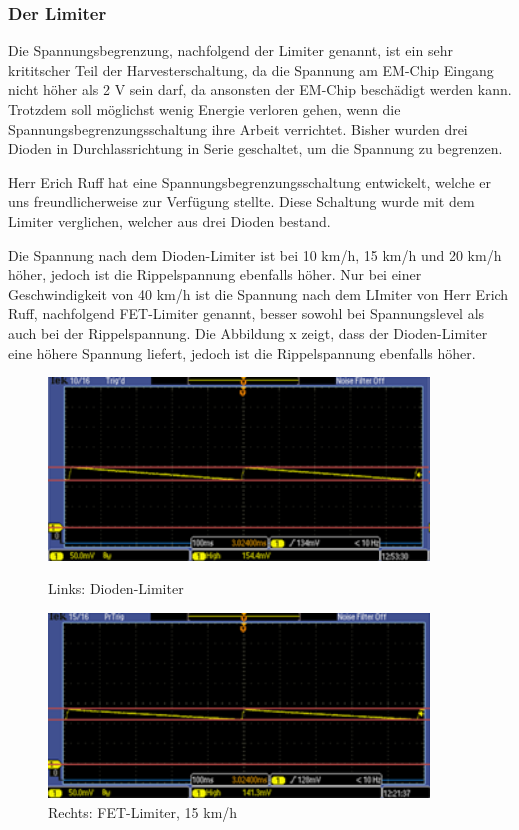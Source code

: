 \subsubsection{Der Limiter}

Die Spannungsbegrenzung, nachfolgend der Limiter genannt, ist ein sehr krititscher Teil der Harvesterschaltung, da die Spannung am EM-Chip Eingang nicht höher als 2 V sein darf, da ansonsten der EM-Chip beschädigt werden kann. Trotzdem soll möglichst wenig Energie verloren gehen, wenn die Spannungsbegrenzungsschaltung ihre Arbeit verrichtet. Bisher wurden drei Dioden in Durchlassrichtung in Serie geschaltet, um die Spannung zu begrenzen.

Herr Erich Ruff hat eine Spannungsbegrenzungsschaltung entwickelt, welche er uns freundlicherweise zur Verfügung stellte. Diese Schaltung wurde mit dem Limiter verglichen, welcher aus drei Dioden bestand.

Die Spannung nach dem Dioden-Limiter ist bei 10 km/h, 15 km/h und 20 km/h höher, jedoch ist die Rippelspannung ebenfalls höher. Nur bei einer Geschwindigkeit von 40 km/h ist die Spannung nach dem LImiter von Herr Erich Ruff, nachfolgend FET-Limiter genannt, besser sowohl bei Spannungslevel als auch bei der Rippelspannung. Die Abbildung x zeigt, dass der Dioden-Limiter eine höhere Spannung liefert, jedoch ist die Rippelspannung ebenfalls höher.

\begin{figure}[ht]
 \begin{minipage}[t]{0.5\textwidth}
    \includegraphics[width=0.9\textwidth]{3Vorgehen/imag/Messung_Optimierung_Limiter_links.png}
    \caption{Links: Dioden-Limiter}
    \label{messung_optimierung_limiter} 
 \end{minipage}
 \begin{minipage}[t]{0.5\textwidth}
    \includegraphics[width=0.9\textwidth]{3Vorgehen/imag/Messung_Optimierung_Limiter_rechts.png}
    \caption{Rechts: FET-Limiter, 15 km/h}
 \end{minipage}
\end{figure}

